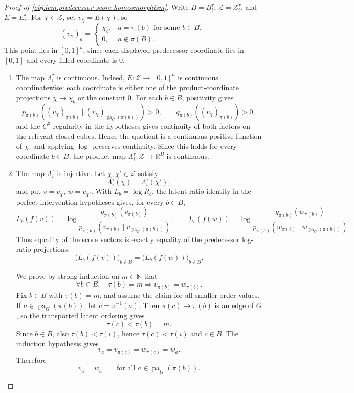 \documentclass[11pt]{article}
\begin{document}
\begin{proof}[Proof of \cref{obj:lem:predecessor-score-homeomorphism}]
Write \(B=B_i^\tau\), \(\mathcal Z=\mathcal Z_i^\tau\), and \(E=E_i^\tau\). For \(\chi\in\mathcal Z\), set \(v_\chi=E(\chi)\), so
\[
(v_\chi)_a
=
\begin{cases}
\chi_b, & a=\pi(b)\text{ for some }b\in B,\\
0, & a\notin \pi(B).
\end{cases}
\]
This point lies in \([0,1]^n\), since each displayed predecessor coordinate lies in \([0,1]\) and every filled coordinate is \(0\).

\begin{enumerate}
\item The map \(\Lambda_i^\tau\) is continuous. Indeed, \(E:\mathcal Z\to[0,1]^n\) is continuous coordinatewise: each coordinate is either one of the product-coordinate projections \(\chi\mapsto\chi_b\) or the constant \(0\). For each \(b\in B\), positivity gives
\[
p_{\pi(b)}\!\left((v_\chi)_{\pi(b)}\mid (v_\chi)_{\operatorname{pa}_G(\pi(b))}\right)>0,
\qquad
q_{\pi(b)}\!\left((v_\chi)_{\pi(b)}\right)>0,
\]
and the \(C^3\) regularity in the hypotheses gives continuity of both factors on the relevant closed cubes. Hence the quotient is a continuous positive function of \(\chi\), and applying \(\log\) preserves continuity. Since this holds for every coordinate \(b\in B\), the product map \(\Lambda_i^\tau:\mathcal Z\to\mathbb R^B\) is continuous. %

\item The map \(\Lambda_i^\tau\) is injective. Let \(\chi,\chi'\in\mathcal Z\) satisfy
\[
\Lambda_i^\tau(\chi)=\Lambda_i^\tau(\chi'),
\]
and put \(v=v_\chi\), \(w=v_{\chi'}\). With \(L_b=\log R_b\), the latent ratio identity in the perfect-intervention hypotheses gives, for every \(b\in B\),
\[
L_b(f(v))
=
\log
\frac{q_{\pi(b)}(v_{\pi(b)})}
{p_{\pi(b)}(v_{\pi(b)}\mid v_{\operatorname{pa}_G(\pi(b))})},
\qquad
L_b(f(w))
=
\log
\frac{q_{\pi(b)}(w_{\pi(b)})}
{p_{\pi(b)}(w_{\pi(b)}\mid w_{\operatorname{pa}_G(\pi(b))})}.
\]
Thus equality of the score vectors is exactly equality of the predecessor log-ratio projections:
\[
\bigl(L_b(f(v))\bigr)_{b\in B}
=
\bigl(L_b(f(w))\bigr)_{b\in B}.
\]

We prove by strong induction on \(m\in\mathbb N\) that
\[
\forall b\in B,\quad \tau(b)=m\Longrightarrow v_{\pi(b)}=w_{\pi(b)}.
\]
Fix \(b\in B\) with \(\tau(b)=m\), and assume the claim for all smaller order values. If \(a\in\operatorname{pa}_G(\pi(b))\), let \(c=\pi^{-1}(a)\). Then \(\pi(c)\to\pi(b)\) is an edge of \(G\), so the transported latent ordering gives
\[
\tau(c)<\tau(b)=m.
\]
Since \(b\in B\), also \(\tau(b)<\tau(i)\), hence \(\tau(c)<\tau(i)\) and \(c\in B\). The induction hypothesis gives
\[
v_a=v_{\pi(c)}=w_{\pi(c)}=w_a.
\]
Therefore
\[
v_a=w_a
\qquad
\text{for all }a\in\operatorname{pa}_G(\pi(b)).
\]


\end{enumerate}
\end{proof}
\end{document}
